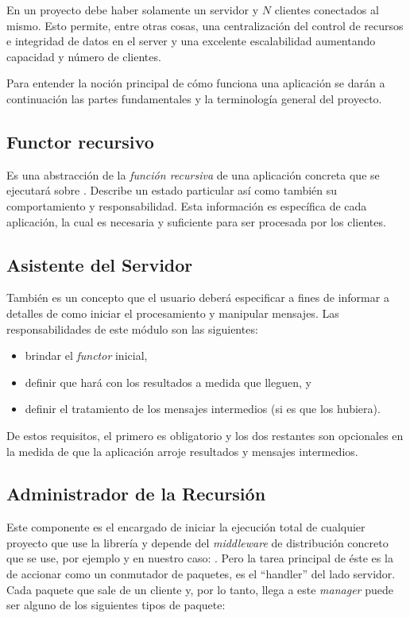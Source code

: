 En un proyecto \rc{} debe haber solamente un servidor y $N$ clientes conectados al mismo. Esto permite, entre otras cosas, una
centralización del control de recursos e integridad de datos en el server y una excelente escalabilidad aumentando capacidad y número de
clientes.

Para entender la noción principal de cómo funciona una aplicación \rc{} se darán a continuación las partes fundamentales y la terminología
general del proyecto.

\subsection{Functor recursivo}
\label{functor}

Es una abstracción de la \textit{función recursiva} de una aplicación concreta que se ejecutará sobre \rc. Describe un
estado particular así como también su comportamiento y responsabilidad. Esta información es específica de cada
aplicación, la cual es necesaria y suficiente para ser procesada por los clientes.

\subsection{Asistente del Servidor}
\label{server_helper}

También es un concepto que el usuario deberá especificar a fines de informar a \rc{} detalles de como iniciar el
procesamiento y manipular mensajes. Las responsabilidades de este módulo son las siguientes:

\begin{itemize}
    \item   brindar el \textit{functor} inicial,
    \item   definir que hará con los resultados a medida que lleguen, y
    \item   definir el tratamiento de los mensajes intermedios (si es que los hubiera).
\end{itemize}
De estos requisitos, el primero es obligatorio y los dos restantes son opcionales en la medida de que la aplicación arroje resultados y
mensajes intermedios.

\subsection{Administrador de la Recursión}
\label{rmanager}
Este componente es el encargado de iniciar la ejecución total de cualquier proyecto que use la librería y depende del
\textit{middleware} de distribución concreto que se use, por ejemplo y en nuestro caso: \fud. Pero la tarea principal de
éste es la de accionar como un conmutador de paquetes, es el ``handler'' del lado servidor. Cada paquete que sale de un
cliente y, por lo tanto, llega a este \textit{manager} puede ser alguno de los siguientes tipos de paquete:

